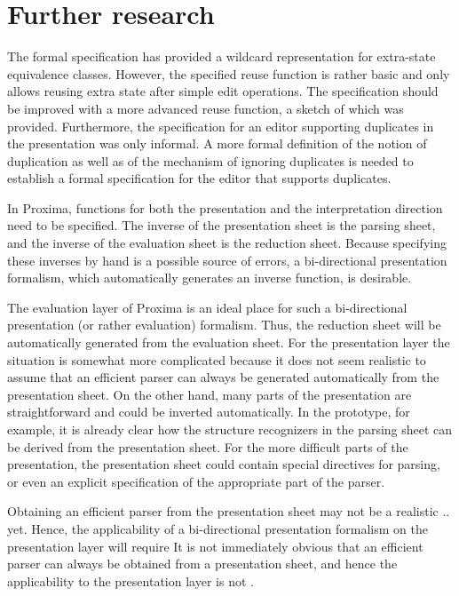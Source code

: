 \section{Further research}

The formal specification has provided a wildcard representation for extra-state equivalence classes. However, the specified reuse function is rather basic and only allows reusing extra state after simple edit operations. The specification should be improved with a more advanced reuse function, a sketch of which was provided. 
Furthermore, the specification for an editor supporting duplicates in the presentation was only informal. A more formal definition of the notion of duplication as well as of the mechanism of ignoring duplicates is needed to establish a formal specification for the editor that supports duplicates. 

In Proxima, functions for both the presentation and the interpretation direction need to be specified. The inverse of the presentation sheet is the parsing sheet, and the inverse of the evaluation sheet is the reduction sheet. Because specifying these inverses by hand is a possible source of errors, a bi-directional presentation formalism, which automatically generates an inverse function, is desirable. 

The evaluation layer of Proxima is an ideal place for such  a bi-directional presentation (or rather evaluation) formalism. Thus, the reduction sheet will be automatically generated from the evaluation sheet. For the presentation layer the situation is somewhat more complicated because it does not seem realistic to assume that an efficient parser can always be generated automatically from the presentation sheet. On the other hand, many parts of the presentation are straightforward and could be inverted automatically. In the prototype, for example, it is already clear how the structure recognizers in the parsing sheet can be derived from the presentation sheet. For the more difficult parts of the presentation, the presentation sheet could contain special directives for parsing, or even an explicit specification of the appropriate part of the parser.


\bc Obtaining an efficient parser from the presentation sheet may not be a realistic .. yet. Hence, the applicability of a bi-directional presentation formalism on the presentation layer will require It is not immediately obvious that an efficient parser can always be obtained from a presentation sheet, and hence the applicability to the presentation layer is not . \ec

